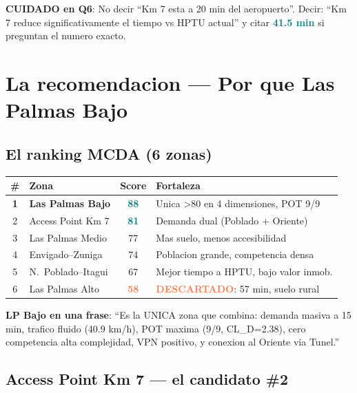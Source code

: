 \documentclass[11pt, a4paper]{article}
\newcommand{\hl}[1]{\textcolor{teal}{\textbf{#1}}}
\newcommand{\dg}[1]{\textcolor{coral}{\textbf{#1}}}
\begin{document}
\begin{alerta}
\textbf{CUIDADO en Q6}: No decir ``Km 7 esta a 20 min del aeropuerto''. Decir: ``Km 7 reduce significativamente el tiempo vs HPTU actual'' y citar \hl{41.5 min} si preguntan el numero exacto.
\end{alerta}


\section{La recomendacion --- Por que Las Palmas Bajo}

\subsection{El ranking MCDA (6 zonas)}

\begin{tabular}{@{}clcl@{}}
\toprule
\textbf{\#} & \textbf{Zona} & \textbf{Score} & \textbf{Fortaleza} \\
\midrule
\rowcolor{bgtip}
\textbf{1} & \textbf{Las Palmas Bajo} & \hl{88} & Unica >80 en 4 dimensiones, POT 9/9 \\
2 & Access Point Km 7 & \hl{81} & Demanda dual (Poblado + Oriente) \\
\rowcolor{bglight}
3 & Las Palmas Medio & 77 & Mas suelo, menos accesibilidad \\
4 & Envigado--Zuniga & 74 & Poblacion grande, competencia densa \\
\rowcolor{bglight}
5 & N.\ Poblado--Itagui & 67 & Mejor tiempo a HPTU, bajo valor inmob. \\
\rowcolor{bgcrit}
6 & Las Palmas Alto & \dg{58} & \dg{DESCARTADO}: 57 min, suelo rural \\
\bottomrule
\end{tabular}

\begin{cita}
\textbf{LP Bajo en una frase}: ``Es la UNICA zona que combina: demanda masiva a 15 min, trafico fluido (40.9 km/h), POT maxima (9/9, CL\_D=2.38), cero competencia alta complejidad, VPN positivo, y conexion al Oriente via Tunel.''
\end{cita}

\subsection{Access Point Km 7 --- el candidato \#2}
\end{document}
